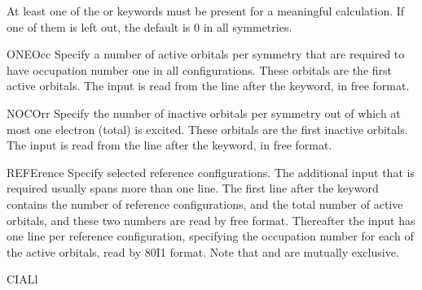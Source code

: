 \begin{keywordlist}
At least one of the  or  keywords must
be present for a meaningful calculation. If one of them is left out,
the default is 0 in all symmetries.
\item[ONEOcc]
Specify a number of active orbitals per symmetry that are required to have occupation
number one in all configurations. These orbitals are the first active orbitals.
The input is read from the line after the keyword, in free format.
\item[NOCOrr]
Specify the number of inactive orbitals per symmetry out of which at most one electron
(total) is excited. These orbitals are the first inactive orbitals.
The input is read from the line after the keyword, in free format.
\item[REFErence]
Specify selected reference configurations. The additional input
that is required usually spans more than one line. The first line
after the keyword contains the number of reference configurations, and
the total number of active orbitals, and these two numbers are
read by free format. Thereafter the input has one line per
reference configuration, specifying the occupation number for each of
the active orbitals, read by 80I1 format. Note that
 and  are mutually exclusive.
\item[CIALl]

\end{keywordlist}

